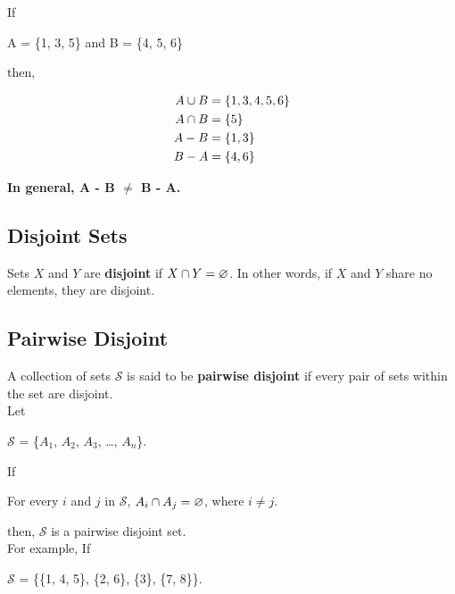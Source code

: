 If

\begin{center}
A = \{1, 3, 5\} and B = \{4, 5, 6\}
\end{center}

then, 

\begin{align*}
    A \cup B &= \{1, 3, 4, 5, 6\}\\
    A \cap B &= \{5\}\\
    A - B &= \{1, 3\}\\
    B - A &= \{4, 6\}
\end{align*}

\textbf{In general, A - B $\neq$ B - A.}\\

\subsection*{Disjoint Sets}

Sets $X$ and $Y$ are \textbf{disjoint} if $X \cap Y = \varnothing$.  In other words, if $X$ and $Y$ share no elements, they are disjoint.

\subsection*{Pairwise Disjoint}

A collection of sets $\mathcal{S}$ is said to be \textbf{pairwise disjoint} if every pair of sets within the set are disjoint.\\

Let

\begin{center}
    $\mathcal{S}$ = \{$A_1$, $A_2$, $A_3$, \dots, $A_n$\}.
\end{center}

If

\begin{center}
    For every $i$ and $j$ in $\mathcal{S}$, $A_i \cap A_j = \varnothing$, where $i \neq j$.
\end{center}

then, $\mathcal{S}$ is a pairwise disjoint set.\\

For example, If

\begin{center}
    $\mathcal{S}$ = \{\{1, 4, 5\}, \{2, 6\}, \{3\}, \{7, 8\}\}.
\end{center}

